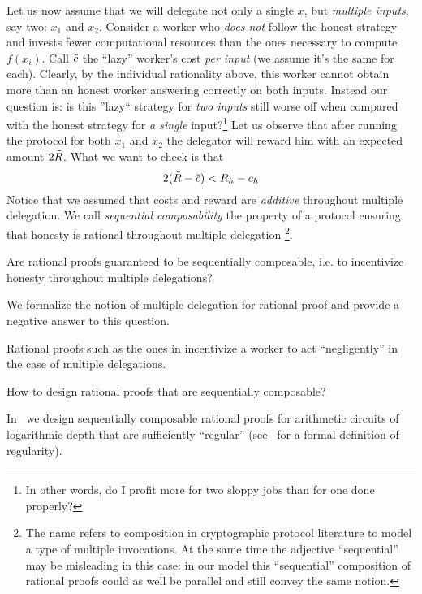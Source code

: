 Let us now assume that we will delegate not only a single $x$, but \textit{multiple inputs}, say two: $x_1$ and $x_2$. Consider a worker who \textit{does not} follow the honest strategy and invests fewer computational resources than the ones necessary to compute $f(x_i)$. Call $\tilde{c}$ the ``lazy'' worker's cost \textit{per input} (we assume it's the same for each). Clearly, by the individual rationality above, this worker cannot obtain more than an honest worker answering correctly on both inputs. Instead our question is: is this ''lazy`` strategy for \textit{two inputs} still worse off when compared with the honest strategy for \textit{a single} input?\footnote{In other words, do I profit more for two sloppy jobs than for one done properly?}
Let us observe that after running the protocol for both $x_1$ and $x_2$ the delegator will reward him with an expected amount $2\tilde{R}$. What we want to check is that
\[
	2(\tilde{R} - \tilde{c}) <  R_h - c_h
\]
Notice that we assumed that costs and reward are \textit{additive} throughout multiple delegation. We call \textit{sequential composability} the property of a protocol ensuring that honesty is rational throughout multiple delegation \footnote{The name refers to composition in cryptographic protocol literature to model a type of multiple invocations. At the same time the adjective ``sequential'' may be misleading in this case: in our model this ``sequential'' composition of rational proofs could as well be parallel and still convey the same notion.}.

\begin{question}\label{q:seq-comp}
	Are rational proofs guaranteed to be sequentially composable, i.e. to incentivize honesty throughout multiple delegations?
\end{question}

We formalize the notion of multiple delegation for rational proof and provide a negative answer to this question.

\begin{result}[~\cite{cg15}]
	Rational proofs such as the ones in \cite{am1} incentivize a worker
	to act ``negligently'' in the case of multiple delegations.
\end{result}

\begin{question}
	How to design rational proofs that are sequentially composable?
\end{question}

In~\cite{cg15} we design sequentially composable rational proofs for arithmetic circuits of logarithmic depth that are sufficiently ``regular'' (see~\cite{cg15} for a formal definition of regularity).

